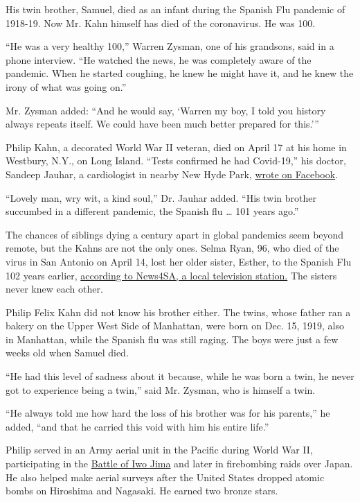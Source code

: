 His twin brother, Samuel, died as an infant during the Spanish Flu
pandemic of 1918-19. Now Mr. Kahn himself has died of the coronavirus.
He was 100.

``He was a very healthy 100,'' Warren Zysman, one of his grandsons, said
in a phone interview. ``He watched the news, he was completely aware of
the pandemic. When he started coughing, he knew he might have it, and he
knew the irony of what was going on.''

Mr. Zysman added: ``And he would say, `Warren my boy, I told you history
always repeats itself. We could have been much better prepared for
this.'''

Philip Kahn, a decorated World War II veteran, died on April 17 at his
home in Westbury, N.Y., on Long Island. ``Tests confirmed he had
Covid-19,'' his doctor, Sandeep Jauhar, a cardiologist in nearby New
Hyde Park, \href{https://www.facebookcorewwwi.onion/sandeepjauhar}{wrote
on Facebook}.

``Lovely man, wry wit, a kind soul,'' Dr. Jauhar added. ``His twin
brother succumbed in a different pandemic, the Spanish flu \ldots{} 101
years ago.''

The chances of siblings dying a century apart in global pandemics seem
beyond remote, but the Kahns are not the only ones. Selma Ryan, 96, who
died of the virus in San Antonio on April 14, lost her older sister,
Esther, to the Spanish Flu 102 years earlier,
\href{https://news4sanantonio.com/news/local/woman-dies-from-coronavirus-102-years-after-sister-died-in-spanish-flu-pandemic}{according
to News4SA, a local television station.} The sisters never knew each
other.

Philip Felix Kahn did not know his brother either. The twins, whose
father ran a bakery on the Upper West Side of Manhattan, were born on
Dec. 15, 1919, also in Manhattan, while the Spanish flu was still
raging. The boys were just a few weeks old when Samuel died.

``He had this level of sadness about it because, while he was born a
twin, he never got to experience being a twin,'' said Mr. Zysman, who is
himself a twin.

``He always told me how hard the loss of his brother was for his
parents,'' he added, ``and that he carried this void with him his entire
life.''

Philip served in an Army aerial unit in the Pacific during World War II,
participating in the
\href{https://www.history.com/topics/world-war-ii/battle-of-iwo-jima}{Battle
of Iwo Jima} and later in firebombing raids over Japan. He also helped
make aerial surveys after the United States dropped atomic bombs on
Hiroshima and Nagasaki. He earned two bronze stars.

